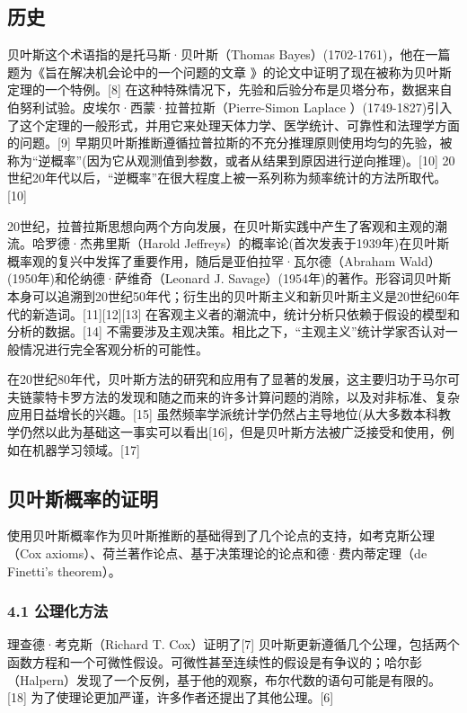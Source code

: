 \subsection{历史}

贝叶斯这个术语指的是托马斯·贝叶斯（Thomas Bayes）(1702-1761)，他在一篇题为《旨在解决机会论中的一个问题的文章 》的论文中证明了现在被称为贝叶斯定理的一个特例。[8] 在这种特殊情况下，先验和后验分布是贝塔分布，数据来自伯努利试验。皮埃尔·西蒙·拉普拉斯（Pierre-Simon Laplace ）(1749-1827)引入了这个定理的一般形式，并用它来处理天体力学、医学统计、可靠性和法理学方面的问题。[9] 早期贝叶斯推断遵循拉普拉斯的不充分推理原则使用均匀的先验，被称为“逆概率”(因为它从观测值到参数，或者从结果到原因进行逆向推理)。[10] 20世纪20年代以后，“逆概率”在很大程度上被一系列称为频率统计的方法所取代。[10]

20世纪，拉普拉斯思想向两个方向发展，在贝叶斯实践中产生了客观和主观的潮流。哈罗德·杰弗里斯（Harold Jeffreys）的概率论(首次发表于1939年)在贝叶斯概率观的复兴中发挥了重要作用，随后是亚伯拉罕·瓦尔德（Abraham Wald）(1950年)和伦纳德·萨维奇（Leonard J. Savage）(1954年)的著作。形容词贝叶斯本身可以追溯到20世纪50年代；衍生出的贝叶斯主义和新贝叶斯主义是20世纪60年代的新造词。[11][12][13] 在客观主义者的潮流中，统计分析只依赖于假设的模型和分析的数据。[14] 不需要涉及主观决策。相比之下，“主观主义”统计学家否认对一般情况进行完全客观分析的可能性。

在20世纪80年代，贝叶斯方法的研究和应用有了显著的发展，这主要归功于马尔可夫链蒙特卡罗方法的发现和随之而来的许多计算问题的消除，以及对非标准、复杂应用日益增长的兴趣。[15] 虽然频率学派统计学仍然占主导地位(从大多数本科教学仍然以此为基础这一事实可以看出[16]，但是贝叶斯方法被广泛接受和使用，例如在机器学习领域。[17]

\subsection{贝叶斯概率的证明}

使用贝叶斯概率作为贝叶斯推断的基础得到了几个论点的支持，如考克斯公理（Cox axioms）、荷兰著作论点、基于决策理论的论点和德·费内蒂定理（de Finetti's theorem）。

\subsubsection{4.1 公理化方法}

理查德·考克斯（Richard T. Cox）证明了[7] 贝叶斯更新遵循几个公理，包括两个函数方程和一个可微性假设。可微性甚至连续性的假设是有争议的；哈尔彭（Halpern）发现了一个反例，基于他的观察，布尔代数的语句可能是有限的。[18] 为了使理论更加严谨，许多作者还提出了其他公理。[6]

